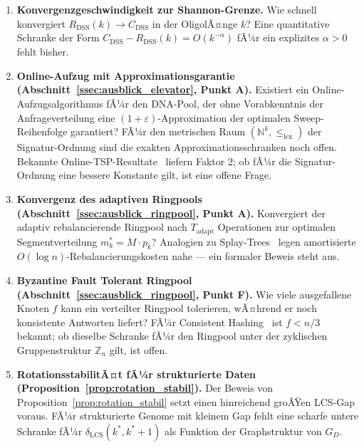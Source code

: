 ﻿\documentclass[a4paper,12pt]{article}
\theoremstyle{definition}
\theoremstyle{plain}
\begin{document}
\begin{enumerate}
  \item \textbf{Konvergenzgeschwindigkeit zur Shannon-Grenze.}
        Wie schnell konvergiert $R_{\mathrm{DSS}}(k) \to C_{\mathrm{DSS}}$
        in der OligolÃ¤nge $k$?  Eine quantitative Schranke der Form
        $C_{\mathrm{DSS}} - R_{\mathrm{DSS}}(k) = O(k^{-\alpha})$ fÃ¼r
        ein explizites $\alpha > 0$ fehlt bisher.

  \item \textbf{Online-Aufzug mit Approximationsgarantie
        (Abschnitt~\ref{ssec:ausblick_elevator}, Punkt A).}
        Existiert ein Online-Aufzugsalgorithmus fÃ¼r den DNA-Pool, der
        ohne Vorabkenntnis der Anfrageverteilung eine
        $(1+\varepsilon)$-Approximation der optimalen Sweep-Reihenfolge
        garantiert?  FÃ¼r den metrischen Raum
        $(\mathbb{N}^k, \le_{\mathrm{lex}})$ der Signatur-Ordnung sind
        die exakten Approximationsschranken noch offen.  Bekannte
        Online-TSP-Resultate~\cite{knuth1998} liefern Faktor $2$;
        ob fÃ¼r die Signatur-Ordnung eine bessere Konstante gilt,
        ist eine offene Frage.

  \item \textbf{Konvergenz des adaptiven Ringpools
        (Abschnitt~\ref{ssec:ausblick_ringpool}, Punkt A).}
        Konvergiert der adaptiv rebalancierende Ringpool nach
        $T_{\mathrm{adapt}}$ Operationen zur optimalen Segmentverteilung
        $m_k^* = M \cdot p_k$?  Analogien zu Splay-Trees~\cite{sleator1985}
        legen amortisierte $O(\log n)$-Rebalancierungskosten nahe ---
        ein formaler Beweis steht aus.

  \item \textbf{Byzantine Fault Tolerant Ringpool
        (Abschnitt~\ref{ssec:ausblick_ringpool}, Punkt F).}
        Wie viele ausgefallene Knoten $f$ kann ein verteilter Ringpool
        tolerieren, wÃ¤hrend er noch konsistente Antworten liefert?
        FÃ¼r Consistent Hashing~\cite{karger1997} ist $f < n/3$ bekannt;
        ob dieselbe Schranke fÃ¼r den Ringpool unter der zyklischen
        Gruppenstruktur $\mathbb{Z}_n$ gilt, ist offen.

  \item \textbf{RotationsstabilitÃ¤t fÃ¼r strukturierte Daten
        (Proposition~\ref{prop:rotation_stabil}).}
        Der Beweis von Proposition~\ref{prop:rotation_stabil} setzt
        einen hinreichend groÃŸen LCS-Gap voraus.  FÃ¼r strukturierte
        Genome mit kleinem Gap fehlt eine scharfe untere Schranke fÃ¼r
        $\delta_{\mathrm{LCS}}(k^*, k^*+1)$ als Funktion der
        Graphstruktur von $G_D$.
\end{enumerate}
\end{document}
